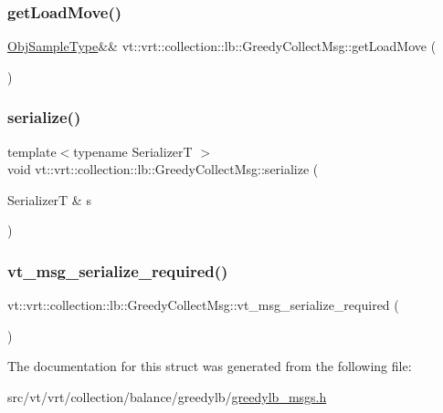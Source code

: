 \subsubsection{\texorpdfstring{get\+Load\+Move()}{getLoadMove()}}
{\footnotesize\ttfamily \hyperlink{structvt_1_1vrt_1_1collection_1_1lb_1_1_greedy_l_b_types_a467f8a79d0785fca5fc95bd5c0f406b9}{Obj\+Sample\+Type}\&\& vt\+::vrt\+::collection\+::lb\+::\+Greedy\+Collect\+Msg\+::get\+Load\+Move (\begin{DoxyParamCaption}{ }\end{DoxyParamCaption})\hspace{0.3cm}{\ttfamily [inline]}}

\mbox{\label{structvt_1_1vrt_1_1collection_1_1lb_1_1_greedy_collect_msg_ac0f5ca855ef36a56595e6ab019cf9487}} 
\subsubsection{\texorpdfstring{serialize()}{serialize()}}
{\footnotesize\ttfamily template$<$typename SerializerT $>$ \\
void vt\+::vrt\+::collection\+::lb\+::\+Greedy\+Collect\+Msg\+::serialize (\begin{DoxyParamCaption}\item[{SerializerT \&}]{s }\end{DoxyParamCaption})\hspace{0.3cm}{\ttfamily [inline]}}

\mbox{\label{structvt_1_1vrt_1_1collection_1_1lb_1_1_greedy_collect_msg_adf48bdb5542440ad7f1c958976f775da}} 
\subsubsection{\texorpdfstring{vt\+\_\+msg\+\_\+serialize\+\_\+required()}{vt\_msg\_serialize\_required()}}
{\footnotesize\ttfamily vt\+::vrt\+::collection\+::lb\+::\+Greedy\+Collect\+Msg\+::vt\+\_\+msg\+\_\+serialize\+\_\+required (\begin{DoxyParamCaption}{ }\end{DoxyParamCaption})}



The documentation for this struct was generated from the following file\+:\begin{DoxyCompactItemize}
\item 
src/vt/vrt/collection/balance/greedylb/\hyperlink{greedylb__msgs_8h}{greedylb\+\_\+msgs.\+h}\end{DoxyCompactItemize}
